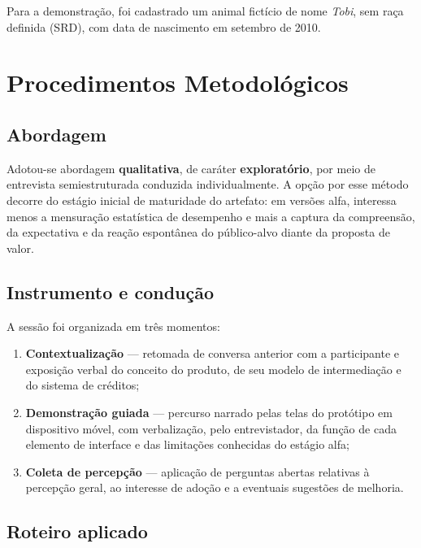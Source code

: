\documentclass[12pt,a4paper]{article}
\begin{document}
Para a demonstração, foi cadastrado um animal fictício de nome \textit{Tobi}, sem raça
definida (SRD), com data de nascimento em setembro de 2010.

\section{Procedimentos Metodológicos}

\subsection{Abordagem}

Adotou-se abordagem \textbf{qualitativa}, de caráter \textbf{exploratório}, por meio de
entrevista semiestruturada conduzida individualmente. A opção por esse método decorre do
estágio inicial de maturidade do artefato: em versões alfa, interessa menos a mensuração
estatística de desempenho e mais a captura da compreensão, da expectativa e da reação
espontânea do público-alvo diante da proposta de valor.

\subsection{Instrumento e condução}

A sessão foi organizada em três momentos:

\begin{enumerate}[label=\textbf{\arabic*.}]
  \item \textbf{Contextualização} --- retomada de conversa anterior com a participante e
        exposição verbal do conceito do produto, de seu modelo de intermediação e do sistema
        de créditos;
  \item \textbf{Demonstração guiada} --- percurso narrado pelas telas do protótipo em
        dispositivo móvel, com verbalização, pelo entrevistador, da função de cada elemento
        de interface e das limitações conhecidas do estágio alfa;
  \item \textbf{Coleta de percepção} --- aplicação de perguntas abertas relativas à percepção
        geral, ao interesse de adoção e a eventuais sugestões de melhoria.
\end{enumerate}

\subsection{Roteiro aplicado}
\end{document}
